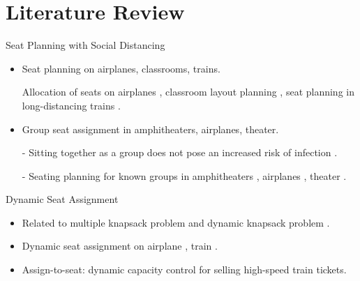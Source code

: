 
\section{Literature Review}
    \frame{\sectionpage}
    \begin{frame}{Seat Planning with Social Distancing}
      \begin{itemize}
        \item Seat planning on airplanes, classrooms, trains.

        Allocation of seats on airplanes \cite{ghorbani2020model}, classroom layout planning \cite{bortolete2022support}, seat planning in long-distancing trains \cite{haque2022optimization}.
        \vspace*{0.5cm}
        \item Group seat assignment in amphitheaters, airplanes, theater.

        \item[-] Sitting together as a group does not pose an increased risk of infection \cite{moore2021seat}.
        \vspace*{0.5cm}

        \item[-] Seating planning for known groups in amphitheaters \cite{haque2022optimization}, airplanes \cite{salari2022social}, theater \cite{blom2022filling}.
      \end{itemize}
      \end{frame}
      
      \begin{frame}{Dynamic Seat Assignment}
        \begin{itemize}
          \item Related to multiple knapsack problem \cite{pisinger1999exact} and dynamic knapsack problem \cite{kleywegt1998dynamic}.
          \vspace*{0.5cm}
          \item Dynamic seat assignment on airplane \cite{hamdouch2011schedule}, train \cite{berge1993demand, zhu2023assign}.
          \vspace*{0.5cm}
          \item Assign-to-seat: dynamic capacity control for selling high-speed train tickets. \cite{zhu2023assign}
        \end{itemize}
      \end{frame}